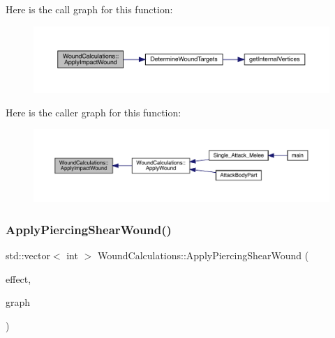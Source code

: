 Here is the call graph for this function\+:
\nopagebreak
\begin{figure}[H]
\begin{center}
\leavevmode
\includegraphics[width=350pt]{db/d1e/class_wound_calculations_a645dc9bb6dfc7d5fc20fc8e8b91fd430_cgraph}
\end{center}
\end{figure}
Here is the caller graph for this function\+:
\nopagebreak
\begin{figure}[H]
\begin{center}
\leavevmode
\includegraphics[width=350pt]{db/d1e/class_wound_calculations_a645dc9bb6dfc7d5fc20fc8e8b91fd430_icgraph}
\end{center}
\end{figure}
\mbox{\label{class_wound_calculations_ac763bba5d770b968ab68532b974d878d}} 
\subsubsection{\texorpdfstring{Apply\+Piercing\+Shear\+Wound()}{ApplyPiercingShearWound()}}
{\footnotesize\ttfamily std\+::vector$<$ int $>$ Wound\+Calculations\+::\+Apply\+Piercing\+Shear\+Wound (\begin{DoxyParamCaption}\item[{\mbox{\hyperlink{struct_applied_force_effect}{Applied\+Force\+Effect}} \&}]{effect,  }\item[{\mbox{\hyperlink{_body_graph_8hpp_ab01b157c2e143191570b012d275fbf0d}{Anatomy\+Graph}} \&}]{graph }\end{DoxyParamCaption})}

